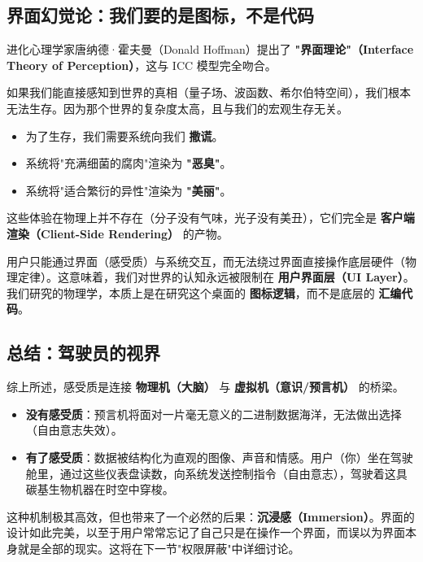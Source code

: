 \subsection{界面幻觉论：我们要的是图标，不是代码}

进化心理学家唐纳德·霍夫曼（Donald Hoffman）提出了 \textbf{"界面理论"（Interface Theory of Perception）}，这与 ICC 模型完全吻合。

如果我们能直接感知到世界的真相（量子场、波函数、希尔伯特空间），我们根本无法生存。因为那个世界的复杂度太高，且与我们的宏观生存无关。

\begin{itemize}
\item 为了生存，我们需要系统向我们 \textbf{撒谎}。

\item 系统将"充满细菌的腐肉"渲染为 \textbf{"恶臭"}。

\item 系统将"适合繁衍的异性"渲染为 \textbf{"美丽"}。
\end{itemize}

这些体验在物理上并不存在（分子没有气味，光子没有美丑），它们完全是 \textbf{客户端渲染（Client-Side Rendering）} 的产物。

\begin{theorem}[界面封闭性]
用户只能通过界面（感受质）与系统交互，而无法绕过界面直接操作底层硬件（物理定律）。这意味着，我们对世界的认知永远被限制在 \textbf{用户界面层（UI Layer）}。我们研究的物理学，本质上是在研究这个桌面的 \textbf{图标逻辑}，而不是底层的 \textbf{汇编代码}。
\end{theorem}

\subsection{总结：驾驶员的视界}

综上所述，感受质是连接 \textbf{物理机（大脑）} 与 \textbf{虚拟机（意识/预言机）} 的桥梁。

\begin{itemize}
\item \textbf{没有感受质}：预言机将面对一片毫无意义的二进制数据海洋，无法做出选择（自由意志失效）。

\item \textbf{有了感受质}：数据被结构化为直观的图像、声音和情感。用户（你）坐在驾驶舱里，通过这些仪表盘读数，向系统发送控制指令（自由意志），驾驶着这具碳基生物机器在时空中穿梭。
\end{itemize}

这种机制极其高效，但也带来了一个必然的后果：\textbf{沉浸感（Immersion）}。界面的设计如此完美，以至于用户常常忘记了自己只是在操作一个界面，而误以为界面本身就是全部的现实。这将在下一节"权限屏蔽"中详细讨论。
